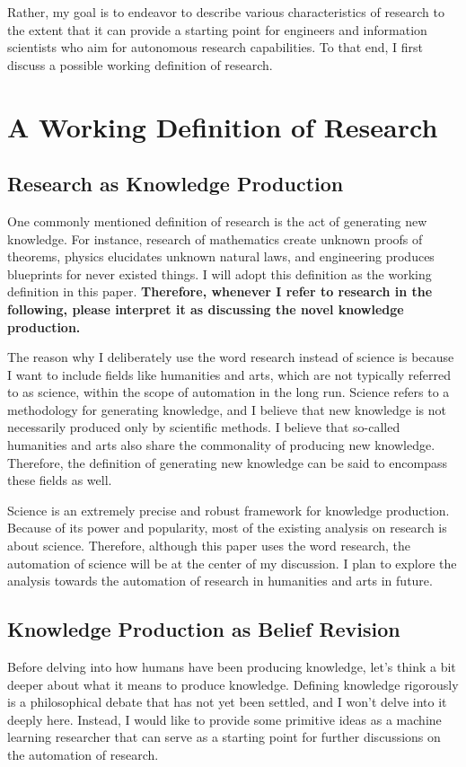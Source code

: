 \documentclass{book}
\begin{document}
Rather, my goal is to endeavor to describe various characteristics of research to the extent that it can provide a starting point for engineers and information scientists who aim for autonomous research capabilities. To that end, I first discuss a possible working definition of research.

\section{A Working Definition of Research}

\subsection{Research as Knowledge Production}

One commonly mentioned definition of research is the act of generating new knowledge. For instance, research of mathematics create unknown proofs of theorems, physics elucidates unknown natural laws, and engineering produces blueprints for never existed things. I will adopt this definition as the working definition in this paper. \textbf{Therefore, whenever I refer to research in the following, please interpret it as discussing the novel knowledge production.}

The reason why I deliberately use the word research instead of science is because I want to include fields like humanities and arts, which are not typically referred to as science, within the scope of automation in the long run. Science refers to a methodology for generating knowledge, and I believe that new knowledge is not necessarily produced only by scientific methods. I believe that so-called humanities and arts also share the commonality of producing new knowledge. Therefore, the definition of generating new knowledge can be said to encompass these fields as well.

Science is an extremely precise and robust  framework for knowledge production. Because of its power and popularity, most of the existing analysis on research is about science. Therefore, although this paper uses the word research, the automation of science will be at the center of my discussion. I plan to explore the analysis towards the automation of research in humanities and arts in future.

\subsection{Knowledge Production as Belief Revision}
Before delving into how humans have been producing knowledge, let's think a bit deeper about what it means to produce knowledge. Defining knowledge rigorously is a philosophical debate that has not yet been settled, and I won't delve into it deeply here. Instead, I would like to provide some primitive ideas as a machine learning researcher that can serve as a starting point for further discussions on the automation of research.
\end{document}
